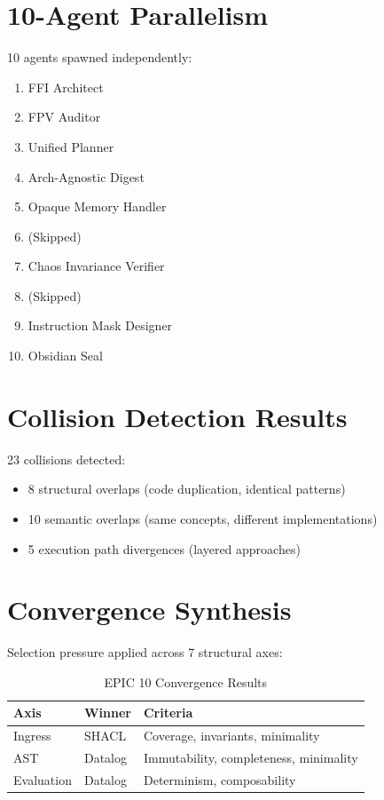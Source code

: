 \documentclass[12pt,oneside,a4paper]{book}
\theoremstyle{definition}
\begin{document}
\section{10-Agent Parallelism}
\label{sec:epic10-agents}

10 agents spawned independently:
\begin{enumerate}
  \item FFI Architect
  \item FPV Auditor
  \item Unified Planner
  \item Arch-Agnostic Digest
  \item Opaque Memory Handler
  \item (Skipped)
  \item Chaos Invariance Verifier
  \item (Skipped)
  \item Instruction Mask Designer
  \item Obsidian Seal
\end{enumerate}

\section{Collision Detection Results}
\label{sec:epic10-collisions}

23 collisions detected:
\begin{itemize}
  \item 8 structural overlaps (code duplication, identical patterns)
  \item 10 semantic overlaps (same concepts, different implementations)
  \item 5 execution path divergences (layered approaches)
\end{itemize}

\section{Convergence Synthesis}
\label{sec:epic10-convergence}

Selection pressure applied across 7 structural axes:
\begin{table}[h]
\centering
\begin{tabular}{lll}
\toprule
\textbf{Axis} & \textbf{Winner} & \textbf{Criteria} \\
\midrule
Ingress & SHACL & Coverage, invariants, minimality \\
AST & Datalog & Immutability, completeness, minimality \\
Evaluation & Datalog & Determinism, composability \\
\bottomrule
\end{tabular}
\caption{EPIC 10 Convergence Results}
\label{tab:epic10-convergence}
\end{table}
\end{document}
